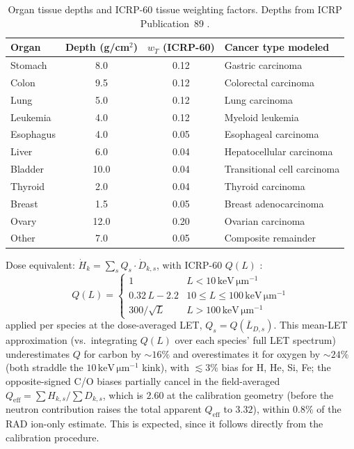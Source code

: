 \documentclass[a4paper,fleqn]{cas-sc}
\newcommand{\keVum}{\,\mathrm{keV\,\mu m^{-1}}}
\newcommand{\Qeff}{Q_\mathrm{eff}}
\begin{document}
\begin{table}[t]
  \centering
  \caption{Organ tissue depths and ICRP-60 tissue weighting factors.
           Depths from ICRP Publication~89 \citep{icrp89}.}
  \label{tab:organ_depths}
  \small
  \begin{tabular*}{\tblwidth}{@{}LCCL@{}}
    \toprule
    Organ & Depth (g/cm$^2$) & $w_T$ (ICRP-60) & Cancer type modeled \\
    \midrule
    Stomach    & 8.0  & 0.12 & Gastric carcinoma \\
    Colon      & 9.5  & 0.12 & Colorectal carcinoma \\
    Lung       & 5.0  & 0.12 & Lung carcinoma \\
    Leukemia   & 4.0  & 0.12 & Myeloid leukemia \\
    Esophagus  & 4.0  & 0.05 & Esophageal carcinoma \\
    Liver      & 6.0  & 0.04 & Hepatocellular carcinoma \\
    Bladder    & 10.0 & 0.04 & Transitional cell carcinoma \\
    Thyroid    & 2.0  & 0.04 & Thyroid carcinoma \\
    Breast     & 1.5  & 0.05 & Breast adenocarcinoma \\
    Ovary      & 12.0 & 0.20 & Ovarian carcinoma \\
    Other      & 7.0  & 0.05 & Composite remainder \\
    \bottomrule
  \end{tabular*}
\end{table}

Dose equivalent: $\dot{H}_k = \sum_s Q_s \cdot \dot{D}_{k,s}$, with ICRP-60
$Q(L)$ \citep{icrp60}:
\begin{equation}
  Q(L) = \begin{cases}
    1                & L < 10\keVum \\
    0.32\,L - 2.2   & 10 \leq L \leq 100\keVum \\
    300 / \sqrt{L}  & L > 100\keVum
  \end{cases}
  \label{eq:quality}
\end{equation}
applied per species at the dose-averaged LET, $Q_s=Q(\overline{L}_{D,s})$.
This mean-LET approximation (vs.\ integrating $Q(L)$ over each species' full
LET spectrum) underestimates $Q$ for carbon by $\sim\!16\%$ and overestimates
it for oxygen by $\sim\!24\%$ (both straddle the $10\keVum$ kink), with
$\lesssim3\%$ bias for H, He, Si, Fe; the opposite-signed C/O biases
partially cancel in the field-averaged $\Qeff = \sum H_{k,s}/\sum D_{k,s}$,
which is $2.60$ at the calibration geometry (before the neutron
contribution raises the total apparent $\Qeff$ to $3.32$), within $0.8\%$
of the RAD ion-only estimate. This is expected, since it follows directly
from the calibration procedure.
\end{document}
